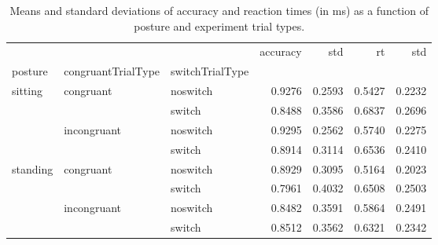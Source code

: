 \begin{table}
\centering
\caption{Means and standard deviations of accuracy and reaction times (in ms) as a function of posture and experiment trial types.}
\label{table-task-switching-replication-reaction-time}
\begin{tabular}{lllrrrr}
\toprule
         &             &        & accuracy &    std &     rt &    std \\
posture & congruantTrialType & switchTrialType &          &        &        &        \\
\midrule
sitting & congruant & noswitch &   0.9276 & 0.2593 & 0.5427 & 0.2232 \\
         &             & switch &   0.8488 & 0.3586 & 0.6837 & 0.2696 \\
         & incongruant & noswitch &   0.9295 & 0.2562 & 0.5740 & 0.2275 \\
         &             & switch &   0.8914 & 0.3114 & 0.6536 & 0.2410 \\
standing & congruant & noswitch &   0.8929 & 0.3095 & 0.5164 & 0.2023 \\
         &             & switch &   0.7961 & 0.4032 & 0.6508 & 0.2503 \\
         & incongruant & noswitch &   0.8482 & 0.3591 & 0.5864 & 0.2491 \\
         &             & switch &   0.8512 & 0.3562 & 0.6321 & 0.2342 \\
\bottomrule
\end{tabular}
\end{table}
